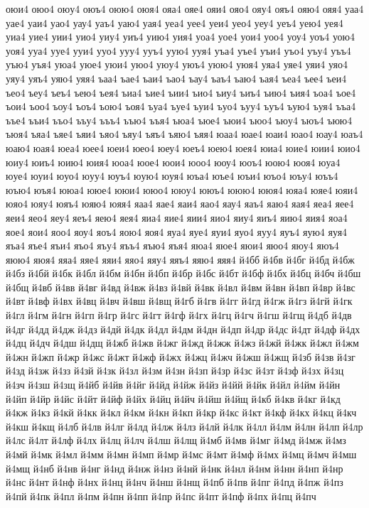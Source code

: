 {оюи4
оюо4
оюу4
оюъ4
оюю4
оюя4
ояа4
ояе4
ояи4
ояо4
ояу4
ояъ4
ояю4
ояя4
уаа4
уае4
уаи4
уао4
уау4
уаъ4
уаю4
уая4
уеа4
уее4
уеи4
уео4
уеу4
уеъ4
уею4
уея4
уиа4
уие4
уии4
уио4
уиу4
уиъ4
уию4
уия4
уоа4
уое4
уои4
уоо4
уоу4
уоъ4
уою4
уоя4
ууа4
ууе4
ууи4
ууо4
ууу4
ууъ4
уую4
ууя4
уъа4
уъе4
уъи4
уъо4
уъу4
уъъ4
уъю4
уъя4
уюа4
уюе4
уюи4
уюо4
уюу4
уюъ4
уюю4
уюя4
уяа4
уяе4
уяи4
уяо4
уяу4
уяъ4
уяю4
уяя4
ъаа4
ъае4
ъаи4
ъао4
ъау4
ъаъ4
ъаю4
ъая4
ъеа4
ъее4
ъеи4
ъео4
ъеу4
ъеъ4
ъею4
ъея4
ъиа4
ъие4
ъии4
ъио4
ъиу4
ъиъ4
ъию4
ъия4
ъоа4
ъое4
ъои4
ъоо4
ъоу4
ъоъ4
ъою4
ъоя4
ъуа4
ъуе4
ъуи4
ъуо4
ъуу4
ъуъ4
ъую4
ъуя4
ъъа4
ъъе4
ъъи4
ъъо4
ъъу4
ъъъ4
ъъю4
ъъя4
ъюа4
ъюе4
ъюи4
ъюо4
ъюу4
ъюъ4
ъюю4
ъюя4
ъяа4
ъяе4
ъяи4
ъяо4
ъяу4
ъяъ4
ъяю4
ъяя4
юаа4
юае4
юаи4
юао4
юау4
юаъ4
юаю4
юая4
юеа4
юее4
юеи4
юео4
юеу4
юеъ4
юею4
юея4
юиа4
юие4
юии4
юио4
юиу4
юиъ4
юию4
юия4
юоа4
юое4
юои4
юоо4
юоу4
юоъ4
юою4
юоя4
юуа4
юуе4
юуи4
юуо4
юуу4
юуъ4
юую4
юуя4
юъа4
юъе4
юъи4
юъо4
юъу4
юъъ4
юъю4
юъя4
ююа4
ююе4
ююи4
ююо4
ююу4
ююъ4
ююю4
ююя4
юяа4
юяе4
юяи4
юяо4
юяу4
юяъ4
юяю4
юяя4
яаа4
яае4
яаи4
яао4
яау4
яаъ4
яаю4
яая4
яеа4
яее4
яеи4
яео4
яеу4
яеъ4
яею4
яея4
яиа4
яие4
яии4
яио4
яиу4
яиъ4
яию4
яия4
яоа4
яое4
яои4
яоо4
яоу4
яоъ4
яою4
яоя4
яуа4
яуе4
яуи4
яуо4
яуу4
яуъ4
яую4
яуя4
яъа4
яъе4
яъи4
яъо4
яъу4
яъъ4
яъю4
яъя4
яюа4
яюе4
яюи4
яюо4
яюу4
яюъ4
яюю4
яюя4
яяа4
яяе4
яяи4
яяо4
яяу4
яяъ4
яяю4
яяя4
й4бб
й4бв
й4бг
й4бд
й4бж
й4бз
й4бй
й4бк
й4бл
й4бм
й4бн
й4бп
й4бр
й4бс
й4бт
й4бф
й4бх
й4бц
й4бч
й4бш
й4бщ
й4вб
й4вв
й4вг
й4вд
й4вж
й4вз
й4вй
й4вк
й4вл
й4вм
й4вн
й4вп
й4вр
й4вс
й4вт
й4вф
й4вх
й4вц
й4вч
й4вш
й4вщ
й4гб
й4гв
й4гг
й4гд
й4гж
й4гз
й4гй
й4гк
й4гл
й4гм
й4гн
й4гп
й4гр
й4гс
й4гт
й4гф
й4гх
й4гц
й4гч
й4гш
й4гщ
й4дб
й4дв
й4дг
й4дд
й4дж
й4дз
й4дй
й4дк
й4дл
й4дм
й4дн
й4дп
й4др
й4дс
й4дт
й4дф
й4дх
й4дц
й4дч
й4дш
й4дщ
й4жб
й4жв
й4жг
й4жд
й4жж
й4жз
й4жй
й4жк
й4жл
й4жм
й4жн
й4жп
й4жр
й4жс
й4жт
й4жф
й4жх
й4жц
й4жч
й4жш
й4жщ
й4зб
й4зв
й4зг
й4зд
й4зж
й4зз
й4зй
й4зк
й4зл
й4зм
й4зн
й4зп
й4зр
й4зс
й4зт
й4зф
й4зх
й4зц
й4зч
й4зш
й4зщ
й4йб
й4йв
й4йг
й4йд
й4йж
й4йз
й4йй
й4йк
й4йл
й4йм
й4йн
й4йп
й4йр
й4йс
й4йт
й4йф
й4йх
й4йц
й4йч
й4йш
й4йщ
й4кб
й4кв
й4кг
й4кд
й4кж
й4кз
й4кй
й4кк
й4кл
й4км
й4кн
й4кп
й4кр
й4кс
й4кт
й4кф
й4кх
й4кц
й4кч
й4кш
й4кщ
й4лб
й4лв
й4лг
й4лд
й4лж
й4лз
й4лй
й4лк
й4лл
й4лм
й4лн
й4лп
й4лр
й4лс
й4лт
й4лф
й4лх
й4лц
й4лч
й4лш
й4лщ
й4мб
й4мв
й4мг
й4мд
й4мж
й4мз
й4мй
й4мк
й4мл
й4мм
й4мн
й4мп
й4мр
й4мс
й4мт
й4мф
й4мх
й4мц
й4мч
й4мш
й4мщ
й4нб
й4нв
й4нг
й4нд
й4нж
й4нз
й4нй
й4нк
й4нл
й4нм
й4нн
й4нп
й4нр
й4нс
й4нт
й4нф
й4нх
й4нц
й4нч
й4нш
й4нщ
й4пб
й4пв
й4пг
й4пд
й4пж
й4пз
й4пй
й4пк
й4пл
й4пм
й4пн
й4пп
й4пр
й4пс
й4пт
й4пф
й4пх
й4пц
й4пч
}
